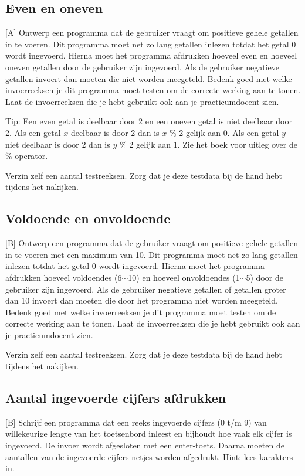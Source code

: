 \documentclass[a4paper,10pt,fleqn,twoside]{article}
\begin{document}
\subsection{Even en oneven}[A]
Ontwerp een programma dat de gebruiker vraagt om positieve gehele getallen in te voeren. Dit programma moet net zo lang getallen inlezen totdat het getal 0 wordt ingevoerd. Hierna moet het programma afdrukken hoeveel even en hoeveel oneven getallen door de gebruiker zijn ingevoerd. Als de gebruiker negatieve getallen invoert dan moeten die niet worden meegeteld. Bedenk goed met welke invoerreeksen je dit programma moet testen om de correcte werking aan te tonen. Laat de invoerreeksen die je hebt gebruikt ook aan je practicumdocent zien.

Tip: Een even getal is deelbaar door 2 en een oneven getal is niet deelbaar door 2. Als een getal $x$ deelbaar is door 2 dan is $x$ \% 2 gelijk aan 0. Als een getal $y$ niet deelbaar is door 2 dan is $y$ \% 2 gelijk aan 1. Zie het boek voor uitleg over de \%-operator.

Verzin zelf een aantal testreeksen. Zorg dat je deze testdata bij de hand hebt tijdens het nakijken.

\subsection{Voldoende en onvoldoende}[B]
Ontwerp een programma dat de gebruiker vraagt om positieve gehele getallen in te voeren met een maximum van 10. Dit programma moet net zo lang getallen inlezen totdat het getal 0 wordt ingevoerd. Hierna moet het programma afdrukken hoeveel voldoendes (6$\cdots$10) en hoeveel onvoldoendes (1$\cdots$5) door de gebruiker zijn ingevoerd. Als de gebruiker negatieve getallen of getallen groter dan 10 invoert dan moeten die door het programma niet worden meegeteld. Bedenk goed met welke invoerreeksen je dit programma moet testen om de correcte werking aan te tonen. Laat de invoerreeksen die je hebt gebruikt ook aan je practicumdocent zien.

Verzin zelf een aantal testreeksen. Zorg dat je deze testdata bij de hand hebt tijdens het nakijken.

\subsection{Aantal ingevoerde cijfers afdrukken}[B]
Schrijf een programma dat een reeks ingevoerde cijfers (0 t/m 9) van willekeurige lengte van het toetsenbord inleest en bijhoudt hoe vaak elk cijfer is ingevoerd. De invoer wordt afgesloten met een enter-toets. Daarna moeten de aantallen van de ingevoerde cijfers netjes worden afgedrukt. Hint: lees karakters in.
\end{document}
